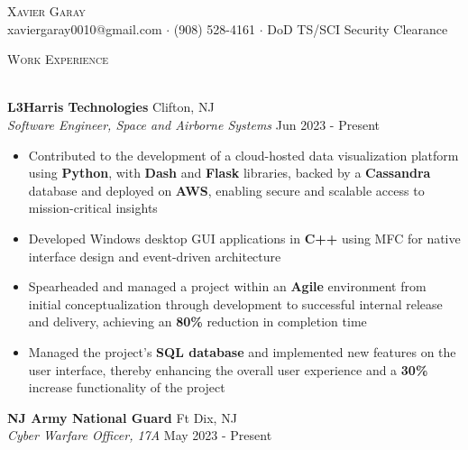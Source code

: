 \documentclass[a4paper]{article}
\newcommand{\lineunder} {
        \vspace*{-8pt} \\
        \hspace*{-18pt} \hrulefill \\
    }
\newcommand{\header} [1] {
        {\hspace*{-18pt}\vspace*{6pt} \textsc{#1}}
        \vspace*{-6pt} \lineunder
    }
\begin{document}
    \vspace*{-40pt}
    
    \vspace*{-10pt}
    \begin{center}
        {\Huge \scshape {Xavier Garay}}\\
        xaviergaray0010@gmail.com $\cdot$ (908) 528-4161 $\cdot$ DoD TS/SCI Security Clearance\\
    \end{center}
    
    \header{Work Experience}
    \vspace{1mm}
    
                \textbf{L3Harris Technologies} \hfill Clifton, NJ\\
                \textit{Software Engineer, Space and Airborne Systems} \hfill Jun 2023 - Present\\
                \vspace{-1mm}
                \begin{itemize} \itemsep 1pt
                
                \item Contributed to the development of a cloud-hosted data visualization platform using \textbf{Python}, with \textbf{Dash} and \textbf{Flask} libraries, backed by a \textbf{Cassandra} database and deployed on \textbf{AWS}, enabling secure and scalable access to mission-critical insights
                \item Developed Windows desktop GUI applications in \textbf{C++} using MFC for native interface design and event-driven architecture
                \item Spearheaded and managed a project within an \textbf{Agile} environment from initial conceptualization through development to successful internal release and delivery, achieving an \textbf{80\%} reduction in completion time
                \item Managed the project’s \textbf{SQL database} and implemented new features on the user interface, thereby enhancing the overall user experience and a \textbf{30\%} increase functionality of the project\end{itemize}
                \textbf{NJ Army National Guard} \hfill Ft Dix, NJ\\
                \textit{Cyber Warfare Officer, 17A} \hfill May 2023 - Present\\
                \vspace{-1mm}
\end{document}
